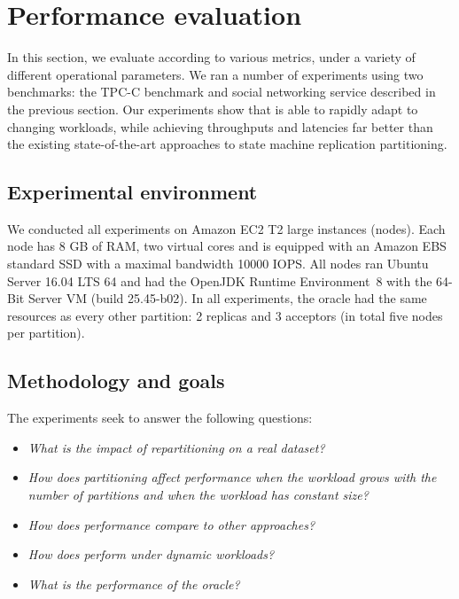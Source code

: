 \section{Performance evaluation}
\label{sec:experiments}

In this section, we evaluate \dynastar{} according to various metrics,
under a variety of different operational parameters.
We ran a number of experiments using two benchmarks: the TPC-C benchmark and
\appname{} social networking service described in the previous section.
Our experiments show that \dynastar{} is able to rapidly adapt to changing 
workloads, while achieving throughputs and latencies far better than the existing
state-of-the-art approaches to state machine replication partitioning.


\subsection{Experimental environment}
\label{sec:evaluation:setup}

We conducted all experiments on Amazon EC2 T2 large instances (nodes). Each node has 8 GB of RAM, 
two virtual cores and is equipped with an Amazon EBS standard SSD with a maximal bandwidth 10000 IOPS.
All nodes ran Ubuntu Server 16.04 LTS 64 and had the OpenJDK Runtime Environment~8 with the
\mbox{64-Bit} Server VM (build 25.45-b02). In all experiments, the oracle 
had the same resources as every other partition: 2 replicas and 3 acceptors 
(in total five nodes per partition).


\subsection{Methodology and goals}
\label{sec:evaluation:methodology}

The experiments seek to answer the following questions:
\begin{itemize}
\item \emph{What is the impact of repartitioning on a real dataset?}
\item \emph{How does partitioning affect performance when the workload grows with the number of partitions and when the workload has constant size?}
\item \emph{How does \dynastar performance compare to other approaches?} 
\item \emph{How does \dynastar perform under dynamic workloads?}
\item \emph{What is the performance of the oracle?}
\end{itemize}

